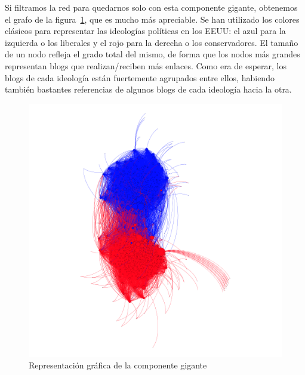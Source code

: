 Si filtramos la red para quedarnos solo con esta componente gigante, obtenemos
el grafo de la figura~\ref{fig:network-giant-component}, que es mucho más
apreciable. Se han utilizado los colores clásicos para representar las
ideologías políticas en los EEUU: el azul para la izquierda o los liberales y el
rojo para la derecha o los conservadores. El tamaño de un nodo refleja el grado
total del mismo, de forma que los nodos más grandes representan blogs que
realizan/reciben más enlaces. Como era de esperar, los blogs de cada ideología
están fuertemente agrupados entre ellos, habiendo también bastantes referencias
de algunos blogs de cada ideología hacia la otra.

\begin{figure}
    \includegraphics[width=\textwidth]{images/network/giant-component.png}
    \caption{Representación gráfica de la componente gigante}
    \label{fig:network-giant-component}
\end{figure}
